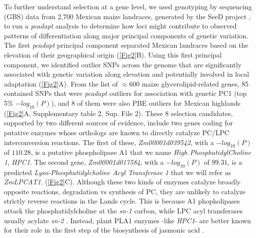 \documentclass[9pt,twocolumn,twoside,lineno]{biorxiv}
\newcommand{\hpc}{\textit{HPC1}\xspace}
\begin{document}
To further understand selection at a gene level, we used genotyping by sequencing (GBS) data from 2,700 Mexican maize landraces, generated by the SeeD project \cite{Romero_Navarro2017-cn, Gates2019-xu}, to run a \textit{pcadapt} \cite{Luu2017-ws} analysis to determine how loci might contribute to observed patterns of differentiation along major principal components of genetic variation. 
The first \textit{pcadapt} principal component separated Mexican landraces based on the elevation of their geographical origin (\cref{Fig2}B).
Using this first principal component, we identified outlier SNPs across the genome that are significantly associated with genetic variation along elevation and potentially involved in local adaptation (\cref{Fig2}A).
From the list of $\approx 600$ maize glycerolipid-related genes, 85 contained SNPs that were \textit{pcadapt} outliers for association with genetic PC1 (top 5\% $-log_{10}(P)$), and 8 of them were also PBE outliers for Mexican highlands (\cref{Fig2}A, Supplementary table 2, Sup. File 2). 
These 8 selection candidates, supported by two different sources of evidence, include two genes coding for putative enzymes whose orthologs are known to directly catalyze PC/LPC interconversion reactions. 
The first of these, \textit{Zm00001d039542}, with a $-log_{10}(P)$ of $110.28$, is  a putative phospholipase A1 that we name \textit{High PhosphatidylCholine 1}, \hpc.
The second gene, \textit{Zm00001d017584}, with a $-log_{10}(P)$ of $99.31$, is  a predicted \textit{Lyso-Phosphatidylcholine Acyl Transferase 1} that we will refer as \textit{ZmLPCAT1}. (\cref{Fig2}C). 
Although these two kinds of enzymes catalyze broadly opposite reactions, degradation vs synthesis of PC, they are unlikely to catalyze strictly reverse reactions in the Lands cycle. 
This is because A1 phopholipases attack the phosphatidylcholine at the \textit{sn-1} carbon, while LPC acyl transferases usually acylate \textit{sn-2} \cite{wang2012,richmond2011}.
Instead, plant PLA1 enzymes -like \hpc- are better known for their role in the first step of the biosynthesis of jasmonic acid \cite{wang2018b, Ishiguro2001-ob}.
\end{document}
